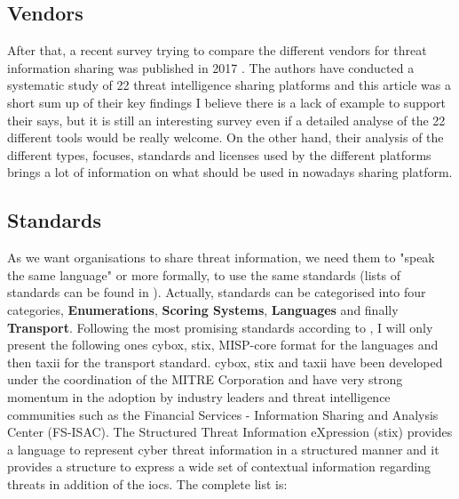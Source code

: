 \documentclass{eplmastersthesis}
\begin{document}
\subsection{Vendors}
After that, a recent survey trying to compare the different vendors for threat information sharing was published in 2017 \cite{sauerwein2017threat}. The authors have conducted a systematic study of 22 threat intelligence sharing platforms and this article was a short sum up of their key findings I believe there is a lack of example to support their says, but it is still an interesting survey even if a detailed analyse of the 22 different tools would be really welcome.
On the other hand, their analysis of the different types, focuses, standards and licenses used by the different platforms brings a lot of information on what should be used in nowadays sharing platform.\\

\subsection{Standards}
\label{sec:standards}
As we want organisations to share threat information, we need them to "speak the same language" or more formally, to use the same standards (lists of standards can be found in \cite{AwesomeTreat, mohaisen2017rethinking}). Actually, standards can be categorised into four categories, \textbf{Enumerations}, \textbf{Scoring Systems}, \textbf{Languages} and finally \textbf{Transport}. Following the most promising standards according to \cite{fransen2015cyber, sauerwein2017threat}, I will only present the following ones \gls{cybox}, \gls{stix}, MISP-core format for the languages and then \gls{taxii} for the transport standard.
\gls{cybox}, \gls{stix} and \gls{taxii} have been developed under the coordination of the MITRE Corporation and have very strong momentum in the adoption by industry leaders and threat intelligence communities such as the Financial Services - Information Sharing and Analysis Center (FS-ISAC).
The Structured Threat Information eXpression (\gls{stix}) \cite{barnum2012standardizing} provides a language to represent cyber threat information in a structured manner and it provides a structure to express a wide set of contextual information regarding threats in addition of the \gls{ioc}s. The complete list is:
\end{document}
